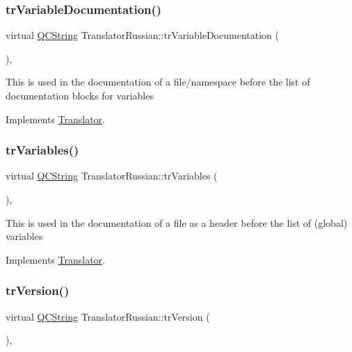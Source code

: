 \subsubsection{\texorpdfstring{trVariableDocumentation()}{trVariableDocumentation()}}
{\footnotesize\ttfamily virtual \mbox{\hyperlink{class_q_c_string}{Q\+C\+String}} Translator\+Russian\+::tr\+Variable\+Documentation (\begin{DoxyParamCaption}{ }\end{DoxyParamCaption})\hspace{0.3cm}{\ttfamily [inline]}, {\ttfamily [virtual]}}

This is used in the documentation of a file/namespace before the list of documentation blocks for variables 

Implements \mbox{\hyperlink{class_translator}{Translator}}.

\mbox{\label{class_translator_russian_a2800e73ecb3290ea64ed38fd635a12bd}} 
\subsubsection{\texorpdfstring{trVariables()}{trVariables()}}
{\footnotesize\ttfamily virtual \mbox{\hyperlink{class_q_c_string}{Q\+C\+String}} Translator\+Russian\+::tr\+Variables (\begin{DoxyParamCaption}{ }\end{DoxyParamCaption})\hspace{0.3cm}{\ttfamily [inline]}, {\ttfamily [virtual]}}

This is used in the documentation of a file as a header before the list of (global) variables 

Implements \mbox{\hyperlink{class_translator}{Translator}}.

\mbox{\label{class_translator_russian_a09e8529f2a3149056cd5044f897102d6}} 
\subsubsection{\texorpdfstring{trVersion()}{trVersion()}}
{\footnotesize\ttfamily virtual \mbox{\hyperlink{class_q_c_string}{Q\+C\+String}} Translator\+Russian\+::tr\+Version (\begin{DoxyParamCaption}{ }\end{DoxyParamCaption})\hspace{0.3cm}{\ttfamily [inline]}, {\ttfamily [virtual]}}


